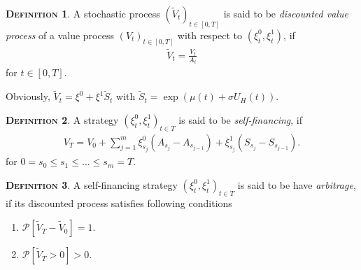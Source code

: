 \documentclass[a4paper, twoside, 11pt]{article}
\theoremstyle{definition}
\newtheorem{definition}{\scshape Definition}[section]
\begin{document}
\begin{definition}
  A stochastic process $(\tilde{V}_t)_{t\in[0,T]}$ is said to be \emph{discounted value process} of a value process $(V_t)_{t\in [0, T]}$ with respect to $(\xi_t^0, \xi_t^1)$, if 
  \begin{eqnarray*}
	\tilde{V}_t = \frac{V_t}{A_t}
  \end{eqnarray*}
  for $t \in [0, T]$.
\end{definition}
Obviously, $\tilde{V}_t = \xi^0 + \xi^1 \tilde{S}_t$ with $\tilde{S}_t=\exp(\mu(t) + \sigma U_H(t))$.
\begin{definition}
  A strategy $(\xi^0_t, \xi^1_t)_{t\in T}$ is said to be \emph{self-financing}, if
  \begin{eqnarray}
	V_T = V_0 + \sum_{j=1}^m \xi^0_{s_j} (A_{s_j} - A_{s_{j-1}}) + \xi^1_{s_j} (S_{s_j} - S_{s_{j-1}}). 
	\label{sec:123}
  \end{eqnarray}
  \label{sec:def}
  for $0=s_0\le s_1\le \dots\le s_m=T$.
\end{definition}

\begin{definition}
  A self-financing strategy $(\xi^0_t, \xi^1_t)_{t\in T}$ is said to be have \emph{arbitrage}, if its discounted process satisfies following conditions
  \begin{enumerate}[topsep=0pt, itemsep=-1ex, partopsep=1ex, parsep=1ex, label=(\roman*)]
	\item $\mathcal{P}[\tilde{V}_T - \tilde{V}_0]=1$.
	\item $\mathcal{P}[\tilde{V}_T > 0] > 0$.
	\end{enumerate}
  \end{definition}
\end{document}
